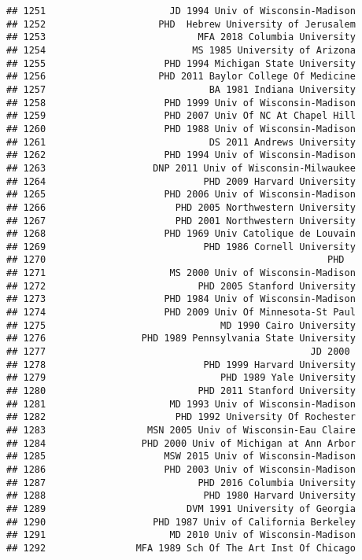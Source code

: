\documentclass[
]{article}
\begin{document}
\begin{verbatim}
## 1251                      JD 1994 Univ of Wisconsin-Madison
## 1252                    PHD  Hebrew University of Jerusalem
## 1253                           MFA 2018 Columbia University
## 1254                          MS 1985 University of Arizona
## 1255                     PHD 1994 Michigan State University
## 1256                    PHD 2011 Baylor College Of Medicine
## 1257                             BA 1981 Indiana University
## 1258                     PHD 1999 Univ of Wisconsin-Madison
## 1259                     PHD 2007 Univ Of NC At Chapel Hill
## 1260                     PHD 1988 Univ of Wisconsin-Madison
## 1261                             DS 2011 Andrews University
## 1262                     PHD 1994 Univ of Wisconsin-Madison
## 1263                   DNP 2011 Univ of Wisconsin-Milwaukee
## 1264                            PHD 2009 Harvard University
## 1265                     PHD 2006 Univ of Wisconsin-Madison
## 1266                       PHD 2005 Northwestern University
## 1267                       PHD 2001 Northwestern University
## 1268                     PHD 1969 Univ Catolique de Louvain
## 1269                            PHD 1986 Cornell University
## 1270                                                  PHD  
## 1271                      MS 2000 Univ of Wisconsin-Madison
## 1272                           PHD 2005 Stanford University
## 1273                     PHD 1984 Univ of Wisconsin-Madison
## 1274                     PHD 2009 Univ Of Minnesota-St Paul
## 1275                               MD 1990 Cairo University
## 1276                 PHD 1989 Pennsylvania State University
## 1277                                               JD 2000 
## 1278                            PHD 1999 Harvard University
## 1279                               PHD 1989 Yale University
## 1280                           PHD 2011 Stanford University
## 1281                      MD 1993 Univ of Wisconsin-Madison
## 1282                       PHD 1992 University Of Rochester
## 1283                  MSN 2005 Univ of Wisconsin-Eau Claire
## 1284                 PHD 2000 Univ of Michigan at Ann Arbor
## 1285                     MSW 2015 Univ of Wisconsin-Madison
## 1286                     PHD 2003 Univ of Wisconsin-Madison
## 1287                           PHD 2016 Columbia University
## 1288                            PHD 1980 Harvard University
## 1289                         DVM 1991 University of Georgia
## 1290                   PHD 1987 Univ of California Berkeley
## 1291                      MD 2010 Univ of Wisconsin-Madison
## 1292                MFA 1989 Sch Of The Art Inst Of Chicago

\end{verbatim}
\end{document}
